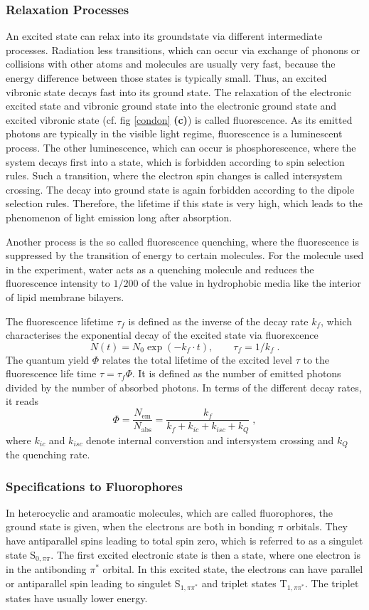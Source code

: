\documentclass{scrartcl}
\numberwithin{equation}{section}
\numberwithin{figure}{section}
\numberwithin{table}{section}
\newcommand{\eq}[2]{\begin{equation}#1\label{#2}\end{equation}}
\begin{document}
\subsubsection{Relaxation Processes}
An excited state can relax into its groundstate via different intermediate processes. Radiation less transitions, which can occur via exchange of phonons or collisions with other atoms and molecules are usually very fast, because the energy difference between those states is typically small. Thus, an excited vibronic state decays fast into its ground state. The relaxation of the electronic excited state and vibronic ground state into the electronic ground state and excited vibronic state (cf. fig \ref{condon} \textbf{(c)}) is called fluorescence. As its emitted photons are typically in the visible light regime, fluorescence is a luminescent process. The other luminescence, which can occur is phosphorescence, where the system decays first into a state, which is forbidden according to spin selection rules. Such a transition, where the electron spin changes is called intersystem crossing. The decay into ground state is again forbidden according to the dipole selection rules. Therefore, the lifetime if this state is very high, which leads to the phenomenon of light emission long after absorption.

Another process is the so called fluorescence quenching, where the fluorescence is suppressed by the transition of energy to certain molecules. For the molecule used in the experiment, water acts as a quenching molecule and reduces the fluorescence intensity to $1/200$ of the value in hydrophobic media like the interior of lipid membrane bilayers.

The fluorescence lifetime $\tau_f$ is defined as the inverse of the decay rate $k_f$, which characterises the exponential decay of the excited state via fluorexcence
\eq{N(t) =N_0 \exp (-k_f \cdot  t) , \qquad \tau_f=1/k_f \; .}{rate}
The quantum yield $\Phi$ relates the total lifetime of the excited level $\tau$ to the fluorescence life time $\tau = \tau_f \Phi$. It is defined as the number of emitted photons divided by the number of absorbed photons. In terms of the different decay rates, it reads
\eq{\Phi = \frac{N_\text{em}}{N_\text{abs}} = \frac{k_f}{k_f +k_{ic} + k_{isc} + k_Q} \; ,}{yield}
where $k_{ic}$ and $k_{isc}$ denote internal converstion and intersystem crossing and $k_Q$ the quenching rate.



\subsubsection{Specifications to Fluorophores}
In heterocyclic and aramoatic molecules, which are called fluorophores, the ground state is given, when the electrons are both in bonding $\pi$ orbitals. They have antiparallel spins leading to total spin zero, which is referred to as a singulet state S$_{0,\pi\pi}$. The first excited electronic state is then a state, where one electron is in the antibonding $\pi^*$ orbital. In this excited state, the electrons can have parallel or antiparallel spin leading to singulet S$_{1, \pi \pi^*}$ and triplet states T$_{1, \pi \pi^*}$. The triplet states have usually lower energy.
\end{document}
